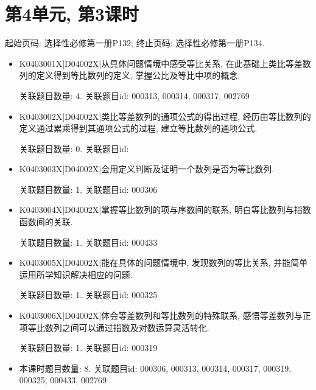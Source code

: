 \section*{第4单元, 第3课时}
起始页码: 选择性必修第一册P132; 终止页码: 选择性必修第一册P134.
\begin{itemize}
\item K0403001X|D04002X|从具体问题情境中感受等比关系, 在此基础上类比等差数列的定义得到等比数列的定义, 掌握公比及等比中项的概念.

关联题目数量: 4. 关联题目id: 000313, 000314, 000317, 002769

\item K0403002X|D04002X|类比等差数列的通项公式的得出过程, 经历由等比数列的定义通过累乘得到其通项公式的过程, 建立等比数列的通项公式.

关联题目数量: 0. 关联题目id: 

\item K0403003X|D04002X|会用定义判断及证明一个数列是否为等比数列.

关联题目数量: 1. 关联题目id: 000306

\item K0403004X|D04002X|掌握等比数列的项与序数间的联系, 明白等比数列与指数函数间的关联.

关联题目数量: 1. 关联题目id: 000433

\item K0403005X|D04002X|能在具体的问题情境中, 发现数列的等比关系, 并能简单运用所学知识解决相应的问题.

关联题目数量: 1. 关联题目id: 000325

\item K0403006X|D04002X|体会等差数列和等比数列的特殊联系, 感悟等差数列与正项等比数列之间可以通过指数及对数运算灵活转化.

关联题目数量: 1. 关联题目id: 000319

\item 本课时题目数量: 8. 关联题目id: 000306, 000313, 000314, 000317, 000319, 000325, 000433, 002769

\end{itemize}

